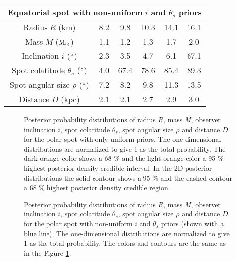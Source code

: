 \documentclass{wihuri}
\def\msun{{\rm M_{\odot}}}
\def\thetas{\theta_{s}}
\begin{document}
\begin{center}
\begin{table}
\begin{center}
\begin{tabular}{| c | c | c | c | c | c |}
      \multicolumn{6}{c}{Equatorial spot with non-uniform $i$ and $\thetas$ priors} \\ \hline
      Radius $R$ (km) & 8.2 & 9.8 & 10.3 & 14.1 & 16.1  \\ \hline
      Mass $M$ ($\msun$) & 1.1 & 1.2 & 1.3 & 1.7 & 2.0  \\ \hline
      Inclination $i$ ($\degree$) & 2.3 & 3.5 & 4.7 & 6.1 & 67.1 \\ \hline
      Spot colatitude $\thetas$ ($\degree$) & 4.0 & 67.4 & 78.6 & 85.4 & 89.3 \\ \hline
      Spot angular size $\rho$ ($\degree$) & 7.2 & 8.2 & 9.8 & 11.3 & 13.5 \\ \hline
      Distance $D$ (kpc) & 2.1 & 2.1 & 2.7 & 2.9 & 3.0 \\ 


    \hline
  \end{tabular}
  \end{center} 

  \end{table}
\end{center} 




\begin{figure}
\centerline{}
\caption{Posterior probability distributions of radius $R$, mass $M$, observer inclination $i$, spot colatitude $\thetas$, spot angular size $\rho$ and distance $D$ for the polar spot with only uniform priors. The one-dimensional distributions are normalized to give 1 as the total probability. The dark orange color shows a 68 \% and the light orange color a 95 \% highest posterior density credible interval. In the 2D posterior distributions the solid contour shows a 95 \% and the dashed contour a 68 \% highest posterior density credible region.  
\label{fig:polpost}}
\end{figure}

\begin{figure}
\centerline{}
\caption{Posterior probability distributions of radius $R$, mass $M$, observer inclination $i$, spot colatitude $\thetas$, spot angular size $\rho$ and distance $D$ for the polar spot with non-uniform $i$ and $\thetas$ priors (shown with a blue line). The one-dimensional distributions are normalized to give 1 as the total probability. The colors and contours are the same as in the Figure \ref{fig:polpost}. 
\label{fig:polpostpr}}
\end{figure}
\end{document}
